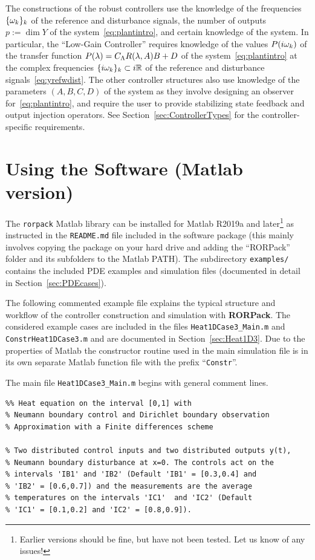 \documentclass[11pt, a4paper]{amsart}
\newcommand{\CL}{C_\Lambda}
\theoremstyle{definition}
\numberwithin{equation}{section}
\newcommand{\RORname}{\textbf{RORPack}}
\begin{document}
The constructions of the robust controllers use the knowledge of the frequencies $\{\omega_k\}_k $ of the reference and disturbance signals, the number of outputs $p:=\dim Y$ of the system~\eqref{eq:plantintro}, and certain knowledge of the system. In particular, the ``Low-Gain Controller'' requires knowledge of the values $P(i\omega_k)$ of the transfer function $P(\gl)=\CL R(\gl,A)B+D$ of the system~\eqref{eq:plantintro} at the complex frequencies $\{i\omega_k\}_k\subset i{\mathbb{R}}$ of the reference and disturbance signals~\eqref{eq:yrefwdist}.
The other controller structures also use knowledge of the parameters $(A,B,C,D)$ of the system as they involve designing an observer for~\eqref{eq:plantintro}, and require the user to provide stabilizing state feedback and output injection operators. See Section~\ref{sec:ControllerTypes} for the controller-specific requirements.

\section{Using the Software (Matlab version)}
\label{sec:Usage}

The \texttt{rorpack} Matlab library can be installed for Matlab R2019a and later\footnote{Earlier versions should be fine, but have not been tested. Let us know of any issues!} as instructed in the \texttt{README.md} file included in the software package (this mainly involves copying the package on your hard drive and adding the ``RORPack'' folder and its subfolders to the Matlab PATH). The subdirectory \texttt{examples/} contains the included PDE examples and simulation files (documented in detail in Section~\ref{sec:PDEcases}).

The following commented example file explains the typical structure and workflow of the controller construction and simulation with \RORname. The considered example cases are included in the files \texttt{Heat1DCase3\_Main.m} and \texttt{ConstrHeat1DCase3.m} and are documented in Section~\ref{sec:Heat1D3}. Due to the properties of Matlab the constructor routine used in the main simulation file is in its own separate Matlab function file with the prefix ``\texttt{Constr}''.

The main file \texttt{Heat1DCase3\_Main.m} begins with general comment lines.

\begin{lstlisting}
%% Heat equation on the interval [0,1] with 
% Neumann boundary control and Dirichlet boundary observation 
% Approximation with a Finite differences scheme 

% Two distributed control inputs and two distributed outputs y(t),
% Neumann boundary disturbance at x=0. The controls act on the
% intervals 'IB1' and 'IB2' (Default 'IB1' = [0.3,0.4] and
% 'IB2' = [0.6,0.7]) and the measurements are the average
% temperatures on the intervals 'IC1'  and 'IC2' (Default
% 'IC1' = [0.1,0.2] and 'IC2' = [0.8,0.9]).
\end{lstlisting}
\end{document}
